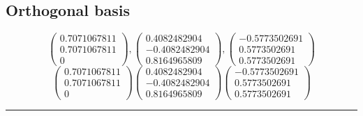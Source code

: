 \documentclass{article}
\begin{document}
\subsection*{ \vspace{1em} Orthogonal basis}
\[
\begin{pmatrix}0.7071067811 \\ 0.7071067811 \\ 0\end{pmatrix}, \begin{pmatrix}0.4082482904 \\ -0.4082482904 \\ 0.8164965809\end{pmatrix}, \begin{pmatrix}-0.5773502691 \\ 0.5773502691 \\ 0.5773502691\end{pmatrix}
\]
\[
\begin{pmatrix}0.7071067811 \\ 0.7071067811 \\ 0\end{pmatrix}
\begin{pmatrix}0.4082482904 \\ -0.4082482904 \\ 0.8164965809\end{pmatrix}
\begin{pmatrix}-0.5773502691 \\ 0.5773502691 \\ 0.5773502691\end{pmatrix}
\]
\vspace{1em}
\hrule
\vspace{1em}
\end{document}
